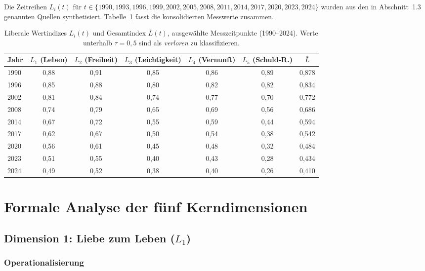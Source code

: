 ﻿\documentclass[a4paper,12pt]{article}
\theoremstyle{definition}
\begin{document}
Die Zeitreihen $L_i(t)$ für $t \in \{1990, 1993, 1996, 1999, 2002, 2005, 2008, 2011, 2014, 2017, 2020, 2023, 2024\}$ wurden aus den in Abschnitt~1.3 genannten Quellen synthetisiert. Tabelle~\ref{tab:daten} fasst die konsolidierten Messwerte zusammen.

\begin{table}[h!]
\centering
\renewcommand{\arraystretch}{1.25}
\begin{tabular}{lcccccc}
\toprule
\textbf{Jahr} & $L_1$ (Leben) & $L_2$ (Freiheit) & $L_3$ (Leichtigkeit) & $L_4$ (Vernunft) & $L_5$ (Schuld-R.) & $\bar{L}$ \\
\midrule
1990 & 0{,}88 & 0{,}91 & 0{,}85 & 0{,}86 & 0{,}89 & 0{,}878 \\
1996 & 0{,}85 & 0{,}88 & 0{,}80 & 0{,}82 & 0{,}82 & 0{,}834 \\
2002 & 0{,}81 & 0{,}84 & 0{,}74 & 0{,}77 & 0{,}70 & 0{,}772 \\
2008 & 0{,}74 & 0{,}79 & 0{,}65 & 0{,}69 & 0{,}56 & 0{,}686 \\
2014 & 0{,}67 & 0{,}72 & 0{,}55 & 0{,}59 & 0{,}44 & 0{,}594 \\
2017 & 0{,}62 & 0{,}67 & 0{,}50 & 0{,}54 & 0{,}38 & 0{,}542 \\
2020 & 0{,}56 & 0{,}61 & 0{,}45 & 0{,}48 & 0{,}32 & 0{,}484 \\
2023 & 0{,}51 & 0{,}55 & 0{,}40 & 0{,}43 & 0{,}28 & 0{,}434 \\
2024 & 0{,}49 & 0{,}52 & 0{,}38 & 0{,}40 & 0{,}26 & 0{,}410 \\
\bottomrule
\end{tabular}
\caption{Liberale Wertindizes $L_i(t)$ und Gesamtindex $\bar{L}(t)$, ausgewählte Messzeitpunkte (1990--2024). Werte unterhalb $\tau = 0{,}5$ sind als \emph{verloren} zu klassifizieren.}
\label{tab:daten}
\end{table}

\section{Formale Analyse der fünf Kerndimensionen}

\subsection{Dimension 1: Liebe zum Leben ($L_1$)}

\subsubsection{Operationalisierung}
\end{document}
